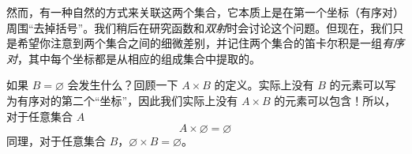 然而，有一种自然的方式来关联这两个集合，它本质上是在第一个坐标（有序对）周围``去掉括号''。我们稍后在研究函数和\emph{双射}时会讨论这个问题。但现在，我们只是希望你注意到两个集合之间的细微差别，并记住两个集合的笛卡尔积是一组\emph{有序对}，其中每个坐标都是从相应的组成集合中提取的。\\

\begin{example}
    如果 $B = \varnothing$ 会发生什么？回顾一下 $A \times B$ 的定义。实际上没有 $B$ 的元素可以写为有序对的第二个``坐标''，因此我们实际上没有 $A \times B$ 的元素可以包含！所以，对于任意集合 $A$
    \[A \times \varnothing = \varnothing\]
    同理，对于任意集合 $B$，$\varnothing \times B = \varnothing$。
\end{example}
